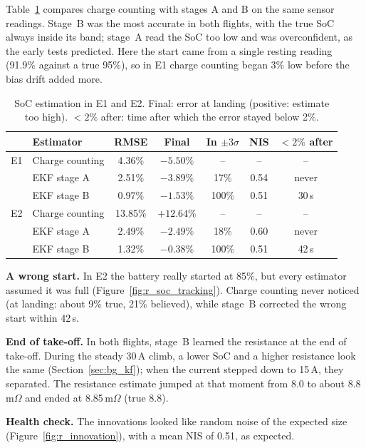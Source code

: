 Table~\ref{tab:r_e1e2} compares charge counting with stages A and B on the same sensor readings. Stage~B was the most accurate in both flights, with the true SoC always inside its band; stage~A read the SoC too low and was overconfident, as the early tests predicted. Here the start came from a single resting reading (91.9\% against a true 95\%), so in E1 charge counting began 3\% low before the bias drift added more.

\begin{table}[htbp]
  \centering
  \caption[SoC estimation in E1 and E2.]{SoC estimation in E1 and E2. Final: error at landing (positive: estimate too high). $<2\%$ after: time after which the error stayed below 2\%.}
  \label{tab:r_e1e2}
  \small
  \setlength{\tabcolsep}{4pt}
  \begin{tabular}{@{}llccccc@{}}
    \toprule
    & Estimator & RMSE & Final & In $\pm 3\sigma$ & NIS & $<2\%$ after \\
    \midrule
    E1 & Charge counting & 4.36\% & $-5.50\%$ & -- & -- & -- \\
       & EKF stage A     & 2.51\% & $-3.89\%$ & 17\%  & 0.54 & never \\
       & EKF stage B     & 0.97\% & $-1.53\%$ & 100\% & 0.51 & 30\,s \\
    \midrule
    E2 & Charge counting & 13.85\% & $+12.64\%$ & -- & -- & -- \\
       & EKF stage A     & 2.49\% & $-2.49\%$ & 18\%  & 0.60 & never \\
       & EKF stage B     & 1.32\% & $-0.38\%$ & 100\% & 0.51 & 42\,s \\
    \bottomrule
  \end{tabular}
\end{table}

\textbf{A wrong start.} In E2 the battery really started at 85\%, but every estimator assumed it was full (Figure~\ref{fig:r_soc_tracking}). Charge counting never noticed (at landing: about 9\% true, 21\% believed), while stage~B corrected the wrong start within 42\,s.

\textbf{End of take-off.} In both flights, stage~B learned the resistance at the end of take-off. During the steady 30\,A climb, a lower SoC and a higher resistance look the same (Section~\ref{sec:bg_kf}); when the current stepped down to 15\,A, they separated. The resistance estimate jumped at that moment from 8.0 to about 8.8\,m$\Omega$ and ended at 8.85\,m$\Omega$ (true 8.8).

\textbf{Health check.} The innovations looked like random noise of the expected size (Figure~\ref{fig:r_innovation}), with a mean NIS of 0.51, as expected.

